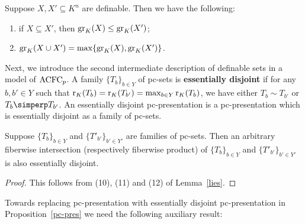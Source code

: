 \begin{cor}
Suppose $X, X' \subseteq K^n$ are definable. Then we have the following:
\begin{enumerate}
\item  if $X \subseteq X'$, then $\mathrm{gr}_K(X) \leq \mathrm{gr}_K(X')$;
\item $\mathrm{gr}_K(X \cup X') = \max\{ \mathrm{gr}_K(X), \mathrm{gr}_K(X') \}$.
\end{enumerate}
\end{cor}


\medskip \noindent
Next, we introduce the second intermediate description of definable sets in a model of $\mathrm{ACFC}_p$.
A family $\{T_b\}_{b \in Y}$ of pc-sets is {\bf essentially disjoint} if for any $b, b' \in Y$ such that $ \mathrm{r}_K(T_b) =\mathrm{r}_K(T_{b'}) = \max_{b \in Y} \mathrm{r}_K(T_b)$, we have  either $T_b \sim T_{b'}$ or  $T_b \simperp T_{b'}$. An essentially disjoint pc-presentation is a pc-presentation which is essentially disjoint as a family of pc-sets.


\begin{lem}
Suppose  $\{T_b\}_{ b \in Y}$  and  $\{T'_{b'}\}_{ b' \in Y'}$ are families of pc-sets. Then an arbitrary fiberwise intersection (respectively fiberwise product) of $\{T_b\}_{ b \in Y}$  and  $\{T'_{b'}\}_{ b' \in Y'}$ is also essentially disjoint.
\end{lem}
\begin{proof}
This follows from (10), (11) and (12) of Lemma~\ref{lies}.
\end{proof}

\noindent
Towards replacing pc-presentation with essentially disjoint pc-presentation in Proposition~\ref{pc-pres} we need the following auxiliary result:
\begin{comment}
\begin{lem} \label{DefClosure1}
If $T \subseteq K^n$ is definable over $c \in K^m$, then there are $l$ and $\beta \in F^l$ such that the closure $V$ of $T$ in $K$-Zariski topology is definable in the field sense over $ \chi(\beta),c$.
\end{lem}

\begin{proof}
Suppose $T, c, V$ are as in the statement. Clearly $V$ is definable in $K$. Also any field automorphism  $\sigma$ of $K$ which fixes $c$ and $\chi(F)$ pointwise can be extended to an automorphism  $\sigma$ of $(F, K;\chi)$. Hence, $\sigma(T)=T$ and so $\sigma(V) =V$. Therefore, $V$ is definable over $\chi(F), c$ in the field sense. By property of definability, we can choose finite $\beta \in F^l$ as desired.
\end{proof}
\end{comment}

